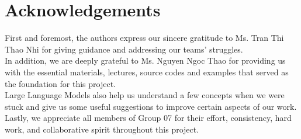 \section{Acknowledgements}

    First and foremost, the authors express our sincere gratitude to Ms. Tran Thi Thao Nhi for giving guidance and addressing our teams' struggles. \\
    
    \indent In addition, we are deeply grateful to Ms. Nguyen Ngoc Thao for providing us with the essential materials, lectures, source codes and examples that served as the foundation for this project.\\
    
    \indent Large Language Models also help us understand a few concepts when we were stuck and give us some useful suggestions to improve certain aspects of our work.\\
    
    \indent Lastly, we appreciate all members of Group 07 for their effort, consistency, hard work, and collaborative spirit throughout this project.\\



